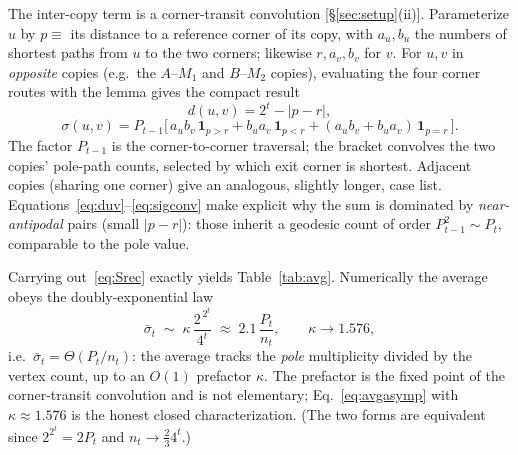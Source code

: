 \documentclass[aps,pre,onecolumn,superscriptaddress,floatfix]{revtex4-2}
\begin{document}
The inter-copy term is a corner-transit convolution
[\S\ref{sec:setup}(ii)]. Parameterize $u$ by $p\equiv$ its distance to a
reference corner of its copy, with $a_u,b_u$ the numbers of shortest paths from
$u$ to the two corners; likewise $r,a_v,b_v$ for $v$. For $u,v$ in
\emph{opposite} copies (e.g.\ the $A$--$M_1$ and $B$--$M_2$ copies), evaluating
the four corner routes with the lemma gives the compact result
\begin{equation}
  d(u,v)=2^{t}-|p-r|,
  \label{eq:duv}
\end{equation}
\begin{equation}
  \sigma(u,v)=P_{t-1}\Big[\,a_u b_v\,\mathbf 1_{p>r}
     + b_u a_v\,\mathbf 1_{p<r}
     + (a_u b_v+b_u a_v)\,\mathbf 1_{p=r}\,\Big].
  \label{eq:sigconv}
\end{equation}
The factor $P_{t-1}$ is the corner-to-corner traversal; the bracket convolves
the two copies' pole-path counts, selected by which exit corner is shortest.
Adjacent copies (sharing one corner) give an analogous, slightly longer, case
list. Equations~\eqref{eq:duv}--\eqref{eq:sigconv} make explicit why the sum is
dominated by \emph{near-antipodal} pairs (small $|p-r|$): those inherit a
geodesic count of order $P_{t-1}^{2}\sim P_t$, comparable to the pole value.

Carrying out~\eqref{eq:Srec} exactly yields Table~\ref{tab:avg}. Numerically the
average obeys the doubly-exponential law
\begin{equation}
  \bar\sigma_t \;\sim\; \kappa\,\frac{2^{\,2^{t}}}{4^{t}}
  \;\approx\; 2.1\,\frac{P_t}{n_t},
  \qquad \kappa\to 1.576,
  \label{eq:avgasymp}
\end{equation}
i.e.\ $\bar\sigma_t=\Theta(P_t/n_t)$: the average tracks the \emph{pole}
multiplicity divided by the vertex count, up to an $O(1)$ prefactor $\kappa$.
The prefactor is the fixed point of the corner-transit convolution and is not
elementary; Eq.~\eqref{eq:avgasymp} with $\kappa\approx1.576$ is the honest
closed characterization. (The two forms are equivalent since $2^{2^{t}}=2P_t$
and $n_t\to\tfrac23 4^{t}$.)
\end{document}
